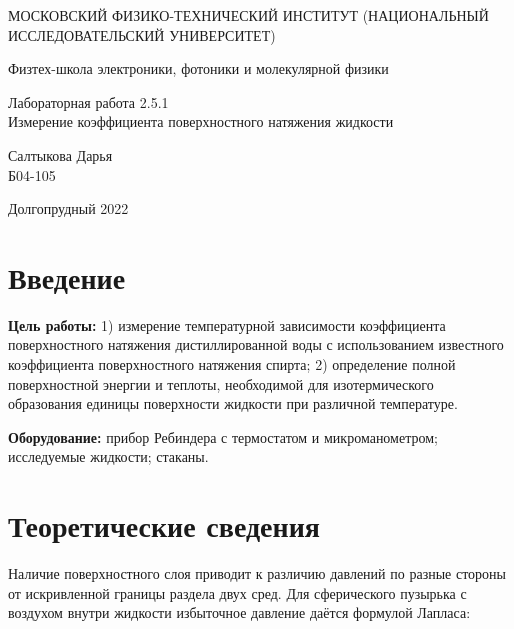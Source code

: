 \documentclass[a4paper,12pt]{article} %
\begin{document}
	
	\begin{titlepage}
	\begin{center}
		{\large МОСКОВСКИЙ ФИЗИКО-ТЕХНИЧЕСКИЙ ИНСТИТУТ (НАЦИОНАЛЬНЫЙ ИССЛЕДОВАТЕЛЬСКИЙ УНИВЕРСИТЕТ)}
	\end{center}
	\begin{center}
		{\large Физтех-школа электроники, фотоники и молекулярной физики}
	\end{center}
	
	
	\vspace{4.5cm}
	{\huge
		\begin{center}
			{Лабораторная работа 2.5.1}\\
			Измерение коэффициента поверхностного натяжения жидкости
		\end{center}
	}
	\vspace{2cm}
	\begin{flushright}
		{\LARGE Салтыкова Дарья \\
			\vspace{0.5cm}
			Б04-105}
	\end{flushright}
	\vspace{8cm}
	\begin{center}
		Долгопрудный 2022
	\end{center}
\end{titlepage}

\section{Введение}

\textbf{Цель работы:} 1) измерение температурной зависимости  коэффициента поверхностного натяжения дистиллированной воды с использованием известного коэффициента поверхностного натяжения спирта;  2) определение полной поверхностной энергии  и теплоты, необходимой для изотермического образования единицы  поверхности жидкости  при различной температуре. 
\medskip

\noindent \textbf{Оборудование:} прибор  Ребиндера  с термостатом и микроманометром; исследуемые жидкости; стаканы.
\medskip

\section{Теоретические сведения}

Наличие поверхностного слоя приводит к различию давлений по разные стороны от искривленной границы раздела двух сред.  Для сферического пузырька с воздухом  внутри жидкости избыточное давление даётся формулой Лапласа:
\end{document}
